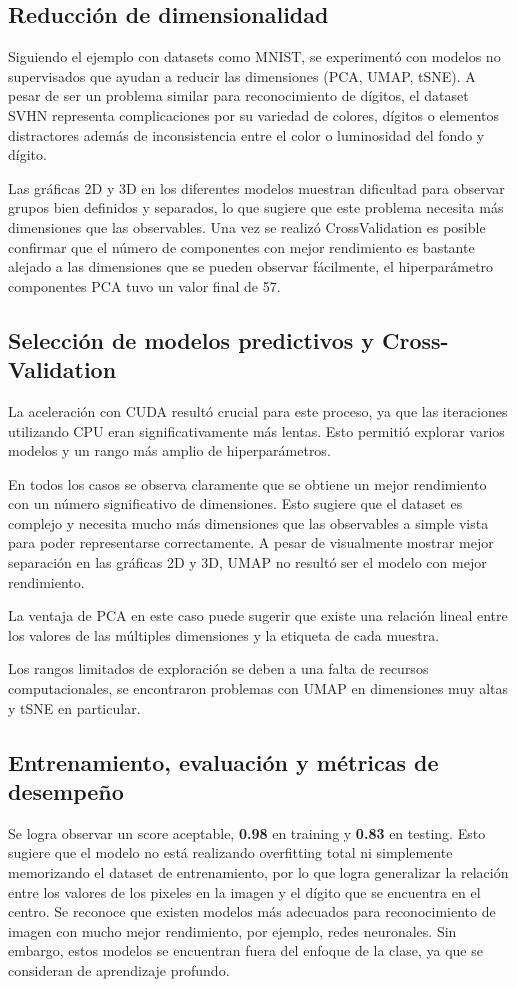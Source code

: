 \documentclass[journal]{IEEEtran}
\begin{document}
\subsection{Reducción de dimensionalidad}
Siguiendo el ejemplo con datasets como MNIST, se experimentó con modelos no supervisados que ayudan a reducir las dimensiones (PCA, UMAP, tSNE). A pesar de ser un problema similar para reconocimiento de dígitos, el dataset SVHN representa complicaciones por su variedad de colores, dígitos o elementos distractores además de inconsistencia entre el color o luminosidad del fondo y dígito.

Las gráficas 2D y 3D en los diferentes modelos muestran dificultad para observar grupos bien definidos y separados, lo que sugiere que este problema necesita más dimensiones que las observables. Una vez se realizó CrossValidation es posible confirmar que el número de componentes con mejor rendimiento es bastante alejado a las dimensiones que se pueden observar fácilmente, el hiperparámetro componentes PCA tuvo un valor final de 57.

\subsection{Selección de modelos predictivos y Cross-Validation}
La aceleración con CUDA resultó crucial para este proceso, ya que las iteraciones utilizando CPU eran significativamente más lentas. Esto permitió explorar varios modelos y un rango más amplio de hiperparámetros.

En todos los casos se observa claramente que se obtiene un mejor rendimiento con un número significativo de dimensiones. Esto sugiere que el dataset es complejo y necesita mucho más dimensiones que las observables a simple vista para poder representarse correctamente. A pesar de visualmente mostrar mejor separación en las gráficas 2D y 3D, UMAP no resultó ser el modelo con mejor rendimiento.

La ventaja de PCA en este caso puede sugerir que existe una relación lineal entre los valores de las múltiples dimensiones y la etiqueta de cada muestra. 

Los rangos limitados de exploración se deben a una falta de recursos computacionales, se encontraron problemas con UMAP en dimensiones muy altas y tSNE en particular.

\subsection{Entrenamiento, evaluación y métricas de desempeño}
Se logra observar un score aceptable, \textbf{0.98} en training y \textbf{0.83} en testing. Esto sugiere que el modelo no está realizando overfitting total ni simplemente memorizando el dataset de entrenamiento, por lo que logra generalizar la relación entre los valores de los pixeles en la imagen y el dígito que se encuentra en el centro. Se reconoce que existen modelos más adecuados para reconocimiento de imagen con mucho mejor rendimiento, por ejemplo, redes neuronales. Sin embargo, estos modelos se encuentran fuera del enfoque de la clase, ya que se consideran de aprendizaje profundo.
\end{document}
